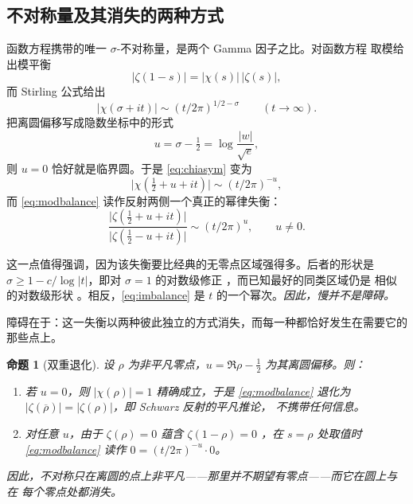 \documentclass[submission,noinfoline]{jsfds}
\newtheorem{proposition}[theorem]{命题}
\newcommand{\Lean}[1]{}
\newcommand{\abs}[1]{\lvert #1\rvert}
\begin{document}
\subsection{不对称量及其消失的两种方式}

函数方程携带的唯一 $\sigma$-不对称量，是两个 Gamma 因子之比。对函数方程
取模给出模平衡 \Lean{zeta_mod_balance}
%
\begin{equation}\label{eq:modbalance}
\abs{\zeta(1-s)}=\abs{\chi(s)}\,\abs{\zeta(s)},
\end{equation}
%
而 Stirling 公式给出 \Lean{GammaRatioAsymmetry}
%
\begin{equation}\label{eq:chiasym}
\abs{\chi(\sigma+it)}\sim (t/2\pi)^{1/2-\sigma}\qquad (t\to\infty).
\end{equation}
%
把离圆偏移写成隐数坐标中的形式 \Lean{asym_exp_log_rho}
%
\begin{equation}\label{eq:udef}
u=\sigma-\tfrac12=\log\frac{\abs w}{\sqrt e},
\end{equation}
%
则 $u=0$ 恰好就是临界圆。于是 \eqref{eq:chiasym} 变为
%
\begin{equation}\label{eq:chiu}
\abs{\chi(\tfrac12+u+it)}\sim (t/2\pi)^{-u},
\end{equation}
%
而 \eqref{eq:modbalance} 读作反射两侧一个真正的幂律失衡：
%
\begin{equation}\label{eq:imbalance}
\frac{\abs{\zeta(\frac12+u+it)}}{\abs{\zeta(\frac12-u+it)}}\sim (t/2\pi)^{u},
\qquad u\neq 0.
\end{equation}

这一点值得强调，因为该失衡要比经典的无零点区域强得多。后者的形状是
$\sigma\ge 1-c/\log\abs t$，即对 $\sigma=1$ 的对数级修正
\citep{deLaValleePoussin1899,Titchmarsh1986}，而已知最好的同类区域仍是
相似的对数级形状 \citep{IwaniecKowalski2004}。相反，\eqref{eq:imbalance}
是 $t$ 的一个幂次。\emph{因此，慢并不是障碍。}

障碍在于：这一失衡以两种彼此独立的方式消失，而每一种都恰好发生在需要它的
那些点上。

\begin{proposition}[双重退化]\label{prop:degeneration}
设 $\rho$ 为非平凡零点，$u=\Re\rho-\tfrac12$ 为其离圆偏移。则：
\begin{enumerate}
\item 若 $u=0$，则 $\abs{\chi(\rho)}=1$ 精确成立，于是
\eqref{eq:modbalance} 退化为
$\abs{\zeta(\overline\rho)}=\abs{\zeta(\rho)}$，即 Schwarz 反射的平凡推论，
不携带任何信息。
\item 对任意 $u$，由于 $\zeta(\rho)=0$ 蕴含 $\zeta(1-\rho)=0$
\Lean{zeta_zero_iff_one_sub}，在 $s=\rho$ 处取值时
\eqref{eq:modbalance} 读作 $0=(t/2\pi)^{-u}\cdot 0$。
\end{enumerate}
因此，不对称只在离圆的点上非平凡——那里并不期望有零点——而它在圆上与在
每个零点处都消失。
\end{proposition}
\end{document}
